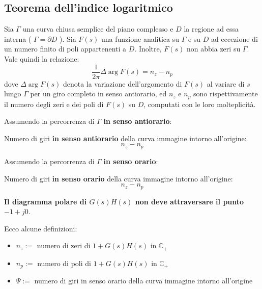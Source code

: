\subsection{Teorema dell'indice logaritmico}
Sia \( \Gamma \) una curva chiusa semplice del piano complesso e \( D \) la
regione ad essa interna ( \( \Gamma = \partial D \) ). Sia \( F(s) \) una
funzione analitica su \( \Gamma \) e su \( D \) ad eccezione di un numero
finito di poli appartenenti a \( D \). Inoltre, \( F(s) \) non abbia zeri su \(
\Gamma \). Vale quindi la relazione: \begin{equation} \frac{1}{2\pi} \Delta
\arg F(s) = n_z - n_p \end{equation} dove \( \Delta \arg F(s) \) denota la
variazione dell'argomento di \( F(s) \) al variare di \( s \) lungo \( \Gamma
\) per un giro completo in senso antiorario, ed \( n_z \) e \( n_p \) sono
rispettivamente il numero degli zeri e dei poli di \( F(s) \) su \( D \),
computati con le loro molteplicità.





Assumendo la percorrenza di $\Gamma$ \textbf{in senso antiorario}:
\begin{theorem}
  Numero di giri \textbf{in senso antiorario} della curva immagine
  intorno all'origine:
  \begin{equation}
    n_{z} - n_{p}
  \end{equation}
\end{theorem}



Assumendo la percorrenza di $\Gamma$ \textbf{in senso orario}:
\begin{theorem}
  Numero di giri \textbf{in senso orario} della curva immagine
  intorno all'origine:
  \begin{equation}
    n_{z} - n_{p}
  \end{equation}
\end{theorem}



\textbf{Il diagramma polare di $G(s)H(s)$ non deve attraversare il punto
$-1+j0$}.

Ecco alcune definizioni:
\begin{itemize}
  \item $n_z :=$ numero di zeri di $1 + G(s)H(s)$ in $\mathbb{C}_{+}$
  \item $n_p :=$ numero di poli di $1 + G(s)H(s)$ in $\mathbb{C}_{+}$
  \item $\Psi := $ numero di giri in senso orario della curva immagine
    intorno all'origine
\end{itemize}

